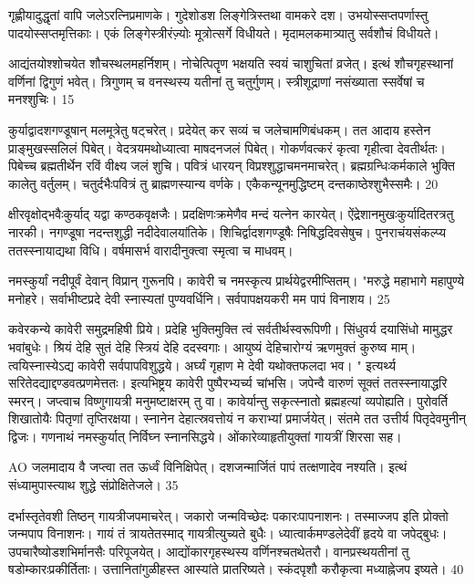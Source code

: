 गृह्णीयादुद्धृतां वापि जलेऽरत्निप्रमाणके।
गुदेशोडश लिङ्गेत्रिस्तथा वामकरे दश।
उभयोस्सप्तपर्णास्तु पादयोस्सप्तमृत्तिकाः।
एकं लिङ्गेस्त्रीरंज़्योः मूत्रोत्सर्गे विधीयते।
मृदामलकमात्र्यातु सर्वशौचं विधीयते।

आद्यंतयोश्शोचयेत शौचस्थलमहर्निशम्।
नोचेत्पितॄण भक्षयति स्वयं चाशुचितां व्रजेत्।
इत्थं शौचगृहस्थानां वर्णिनां द्विगुणं भवेत्।
त्रिगुणम् च वनस्थस्य यतीनां तु चतुर्गुणम्।
स्त्रीशूद्राणां नसंख्याता स्सर्वेषां च मनश्शुचिः।
15

कुर्याद्वादशगण्डूषान् मलमूत्रेतु षट्चरेत्।
प्रदेयेत् कर सव्यं च जलेचामणिबंधकम्।
तत आदाय हस्तेन प्राङ्मुखस्सलिलं पिबेत्।
वेदत्रयमथोध्यात्वा माषदनजलं पिबेत्।
गोकर्णवत्करं कृत्वा गृहीत्वा देवतीर्थतः।
पिबेच्च ब्रह्मतीर्थेन रविं वीक्ष्य जलं शुचि।
पवित्रं धारयन् विप्रश्शुद्धाचमनमाचरेत्।
ब्रह्मग्रन्धिःकर्मकाले भुक्ति कालेतु वर्तुलम्।
चतुर्दभैःपवित्रं तु ब्राह्मणस्यान्य वर्णके।
एकैकन्यूनमुद्धिष्टम् दन्तकाष्ठेश्शुभैस्समैः।
20

क्षीरवृक्षोद्भवैःकुर्याद् यद्वा कण्ठकवृक्षजैः।
प्रदक्षिणःक्रमेणैव मन्दं यत्नेन कारयेत्।
ऐंद्रेशानमुखःकुर्यादितरत्रतु नारकी।
नगण्डूषा नदन्तशुद्धी नदीदेवालयांतिके।
शिचिर्द्वादशगण्डूषैः निषिद्धदिवसेषुच।
पुनराचंयसंकल्प्य ततस्स्नायाद्यथा विधि।
वर्षमासर्भ वारादीनुक्त्वा स्मृत्वा च माधवम्।

नमस्कुर्यां नदीपूर्वं देवान् विप्रान् गुरूनपि।
कावेरी च नमस्कृत्य प्रार्थयेद्वरमीप्सितम्।
"मरुद्धे महाभागे महापुण्ये मनोहरे।
सर्वाभीष्टप्रदे देवी स्नास्यतां पुण्यवर्धिनि।
सर्वपापक्षयकरी मम पापं विनाशय।
25

कवेरकन्ये कावेरी समुद्रमहिषी प्रिये।
प्रदेहि भुक्तिमुक्ति त्वं सर्वतीर्थस्वरूपिणी।
सिंधुवर्य दयासिंधो मामुद्धर भवांबुधेः।
श्रियं देहि सुतं देहि स्त्रियं देहि ददस्वगाः।
आयुष्यं देहिचारोग्यं ऋणमुक्तं कुरुष्व माम्।
त्वयिस्नास्येऽद्य कावेरी सर्वपापविशुद्धये।
अर्घ्यं गृहाण मे देवी यथोक्तफलदा भव।
" इत्यर्थ्य सरितेदद्याद्दण्डवत्प्रणमेत्ततः।
इत्यभिष्ट्रय कावेरी पुष्पैरभ्यर्च्य चांभसि।
जपेन्वै वारुणं सूक्तं ततस्स्नायाद्धरि स्मरन्।
जप्त्वाच विष्णुगायत्री मनुमष्टाक्षरम् तु वा।
कावेर्यान्तु सकृत्स्नातो ब्रह्महत्यां व्यपोह्यति।
पुरोवर्ति शिखातोयैः पितृणां तृप्तिरक्षया।
स्नानेन देहात्स्रवत्तोयं न कराभ्यां प्रमार्जयेत्।
संतमे तत उत्तीर्य पितृदेवमुनीन् द्विजः।
गणनाथं नमस्कुर्यात् निर्विघ्न स्नानसिद्धये।
ओंकारेव्याहृतीयुक्तां गायत्रीं शिरसा सह।

AO
जलमादाय वै जप्त्वा तत ऊर्ध्वं विनिक्षिपेत्।
दशजन्मार्जितं पापं तत्क्षणादेव नश्यति।
इत्थं संध्यामुपास्त्याथ शुद्धे संप्रोक्षितेजले।
35

दर्भास्तृतेवशी तिष्ठन् गायत्रीजपमाचरेत्।
जकारो जन्मविच्छेदः पकारःपापनाशनः।
तस्माज्जप इति प्रोक्तो जन्मपाप विनाशनः।
गायं तं त्रायतेतस्माद् गायत्रीत्युच्यते बुधैः।
ध्यात्वार्कमण्डलेदेवीं हृदये वा जपेद्बुधः।
उपचारैष्योडशभिर्मानसैः परिपूजयेत्।
आद्योंकारगृहस्थस्य वर्णिनश्चतथेतरौ।
वानप्रस्थयतीनां तु षडोम्कारःप्रकीर्तिताः।
उत्तानितांगुळीहस्त आस्यांते प्रातरिष्यते।
स्कंदपृशौ करौकृत्वा मध्याह्नेजप इष्यते।
40

